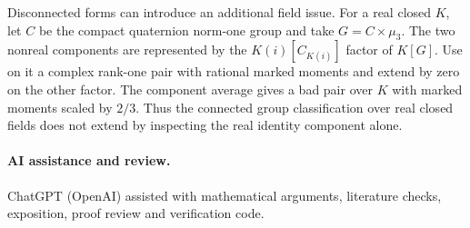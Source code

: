 \documentclass[11pt]{article}
\begin{document}
Disconnected forms can introduce an additional field issue. For
a real closed \(K\), let \(C\) be the compact quaternion norm-one
group and take \(G=C\times\mu_3\). The two nonreal components are
represented by the \(K(i)[C_{K(i)}]\) factor of \(K[G]\).
Use on it a complex rank-one pair with rational marked moments
and extend by zero on the other factor. The component average
gives a bad pair over \(K\) with marked moments scaled by \(2/3\).
Thus the connected group classification over real closed fields
does not extend by inspecting the real identity component alone.

\paragraph{AI assistance and review.}
ChatGPT (OpenAI) assisted with mathematical arguments, literature checks,
exposition, proof review and verification code.
\end{document}
